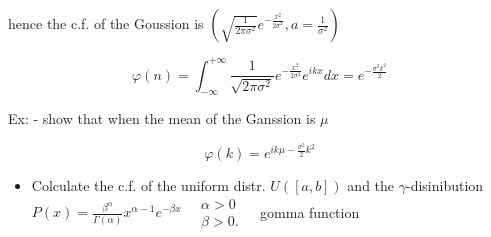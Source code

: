 \documentclass[10pt]{article}
\begin{document}
hence the c.f. of the Goussion is $\left(\sqrt{\frac{1}{2 \pi \sigma^{2}}} e^{-\frac{x^{2}}{2 \sigma^{2}}}, a=\frac{1}{\sigma^{2}}\right)$


\begin{equation*}
\varphi(n)=\int_{-\infty}^{+\infty} \frac{1}{\sqrt{2 \pi \sigma^{2}}} e^{-\frac{x^{2}}{2 \sigma^{2}}} e^{i k x} d x=e^{-\frac{\sigma^{2} k^{2}}{2}} \tag{6}
\end{equation*}


Ex: - show that when the mean of the Ganssion is $\mu$

$$
\varphi(k)=e^{i k \mu-\frac{\sigma^{2}}{2} k^{2}}
$$

\begin{itemize}
  \item Colculate the c.f. of the uniform distr. $U([a, b])$ and the $\gamma$-disinibution $P(x)=\frac{\beta^{\alpha}}{\Gamma(\alpha)} x^{\alpha-1} e^{-\beta x} \quad \begin{aligned} \alpha>0 & \\ \beta>0 . & \end{aligned}$ gomma function
\end{itemize}
\end{document}
